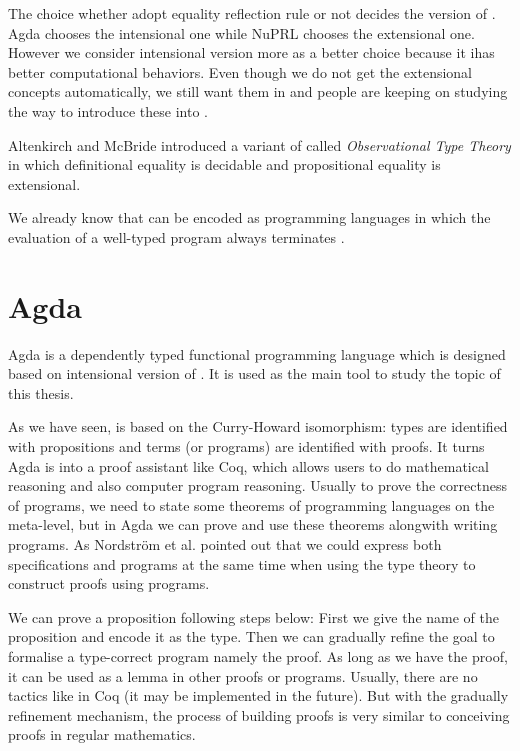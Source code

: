 The choice whether adopt equality reflection rule or not decides the version of \mltt. Agda chooses the intensional one while NuPRL chooses the extensional one.  However we consider intensional version more as a better choice because it ihas better computational behaviors. Even though we do not get the extensional concepts automatically, we still want them in \itt and people are keeping on studying the way to introduce these into \itt.

Altenkirch and McBride introduced a variant of \ett called
\emph{Observational Type Theory}  \cite{alt:06} in which definitional equality is
decidable and propositional equality is extensional.


We already know that \mltt can be encoded as programming languages in
which the evaluation of a well-typed program always terminates \cite{nor:90}.


\section{Agda}

Agda is a dependently typed functional programming language which is designed based on intensional version
of \mltt \cite{agdawiki:main}. It is used as the main tool to study the topic of this thesis.

As we have seen, \mltt is based on the Curry-Howard
isomorphism: types are identified with propositions and terms (or programs) are identified with proofs. It turns Agda is into a proof assistant like Coq, which allows users to do mathematical reasoning and also computer program reasoning. 
Usually to prove the correctness of programs, we need to state some theorems of programming languages on the meta-level, but in Agda we can prove and use these theorems alongwith writing programs.  As Nordström et al. \cite{nps} pointed out that we could express both specifications and programs at the same time when using the type theory to construct proofs using programs.


We can prove a proposition following steps below:
First we give the name of the proposition and encode it as the type. Then we can gradually refine the goal to formalise a type-correct program namely the proof. As long as we have the proof, it can be used as a lemma in other proofs or programs. Usually, there are no tactics like in Coq (it may be implemented in the future). But with the gradually refinement mechanism, the process of building proofs is very similar to conceiving proofs in regular mathematics.


